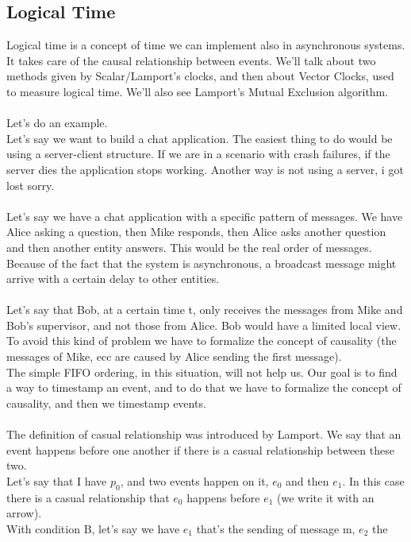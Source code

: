 \documentclass[11pt, a4paper]{article}
\begin{document}
\subsection{Logical Time}
Logical time is a concept of time we can implement also in asynchronous systems.
It takes care of the causal relationship between events. We'll talk about two
methods given by Scalar/Lamport's clocks, and then about Vector Clocks, used to
measure logical time. We'll also see Lamport's Mutual Exclusion algorithm.\\\\
Let's do an example.\\
Let's say we want to build a chat application. The easiest thing to do would be
using a server-client structure. If we are in a scenario with crash failures, if the
server dies the application stops working. Another way is not using a server,
i got
lost sorry.\\\\
Let's say we have a chat application with a specific pattern of messages. We have
Alice asking a question, then Mike responds, then Alice asks another question and
then another entity answers. This would be the real order of messages.\\
Because of the fact that the system is asynchronous, a broadcast message might
arrive with a certain delay to other entities.\\\\
Let's say that Bob, at a certain time t, only receives the messages from Mike and
Bob's supervisor, and not those from Alice. Bob would have a limited local view.
To avoid this kind of problem we have to formalize the concept of causality (the
messages of Mike, ecc are caused by Alice sending the first message).\\
The simple FIFO ordering, in this situation, will not help us. Our goal is to find a
way to timestamp an event, and to do that we have to formalize the concept of
causality, and then we timestamp events.\\\\
The definition of casual relationship was introduced by Lamport. We say that an
event happens before one another if there is a casual relationship between these
two.\\
Let's say that I have $p_0$, and two events happen on it, $e_0$ and then $e_1$. In this case
there is a casual relationship that $e_0$ happens before $e_1$ (we write it with an
arrow).\\
With condition B, let's say we have $e_1$ that's the sending of message m, $e_2$ the
\end{document}
